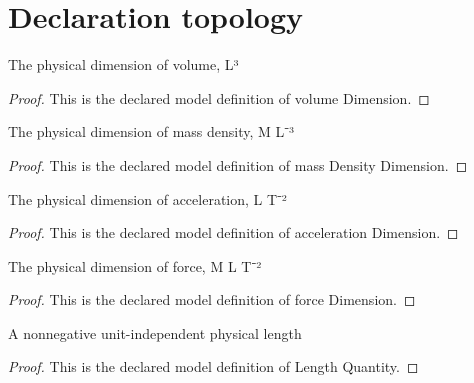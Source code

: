 \section{Declaration topology}
\begin{definition}
  \label{def:physics:phyx-mini-0722:phyxminiproblems-problemphyxmini0722-volumedimension}
  The physical dimension of volume, L³
\end{definition}
\begin{proof}
  This is the declared model definition of volume Dimension.
\end{proof}
\begin{definition}
  \label{def:physics:phyx-mini-0722:phyxminiproblems-problemphyxmini0722-massdensitydimension}
  The physical dimension of mass density, M L⁻³
\end{definition}
\begin{proof}
  This is the declared model definition of mass Density Dimension.
\end{proof}
\begin{definition}
  \label{def:physics:phyx-mini-0722:phyxminiproblems-problemphyxmini0722-accelerationdimension}
  The physical dimension of acceleration, L T⁻²
\end{definition}
\begin{proof}
  This is the declared model definition of acceleration Dimension.
\end{proof}
\begin{definition}
  \label{def:physics:phyx-mini-0722:phyxminiproblems-problemphyxmini0722-forcedimension}
  The physical dimension of force, M L T⁻²
\end{definition}
\begin{proof}
  This is the declared model definition of force Dimension.
\end{proof}
\begin{definition}
  \label{def:physics:phyx-mini-0722:phyxminiproblems-problemphyxmini0722-lengthquantity}
  A nonnegative unit-independent physical length
\end{definition}
\begin{proof}
  This is the declared model definition of Length Quantity.
\end{proof}

